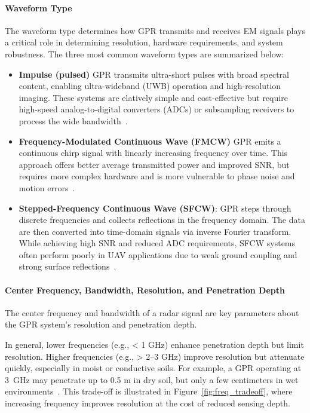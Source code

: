 \paragraph{Waveform Type}

The waveform type determines how GPR transmits and receives EM signals plays a critical role in determining resolution, hardware requirements, and system robustness. The three most common waveform types are summarized below:

\begin{itemize}
    \item \textbf{Impulse (pulsed)} GPR transmits ultra-short pulses with broad spectral content, enabling ultra-wideband (UWB) operation and high-resolution imaging. These systems are elatively simple and cost-effective but require high-speed analog-to-digital converters (ADCs) or subsampling receivers to process the wide bandwidth~\cite{chen2023ground,sipos2017drone}.

    \item \textbf{Frequency-Modulated Continuous Wave (FMCW)} GPR emits a continuous chirp signal with linearly increasing frequency over time. This approach offers better average transmitted power and improved SNR, but requires more complex hardware and is more vulnerable to phase noise and motion errors~\cite{burr2018design}.
    
    \item \textbf{Stepped-Frequency Continuous Wave (SFCW)}: GPR steps through discrete frequencies and collects reflections in the frequency domain. The data are then converted into time-domain signals via inverse Fourier transform. While achieving high SNR and reduced ADC requirements, SFCW systems often perform poorly in UAV applications due to weak ground coupling and strong surface reflections~\cite{tronca2018comparison}.
\end{itemize}


\paragraph{Center Frequency, Bandwidth, Resolution, and Penetration Depth}

The center frequency and bandwidth of a radar signal are key parameters about the GPR system’s resolution and penetration depth. 

In general, lower frequencies (e.g., < 1 GHz) enhance penetration depth but limit resolution. Higher frequencies (e.g., > 2--3 GHz) improve resolution but attenuate quickly, especially in moist or conductive soils. For example, a GPR operating at 3~GHz may penetrate up to 0.5 m in dry soil, but only a few centimeters in wet environments~\cite{alqudsi2021review}. This trade-off is illustrated in Figure~\ref{fig:freq_tradeoff}, where increasing frequency improves resolution at the cost of reduced sensing depth.

